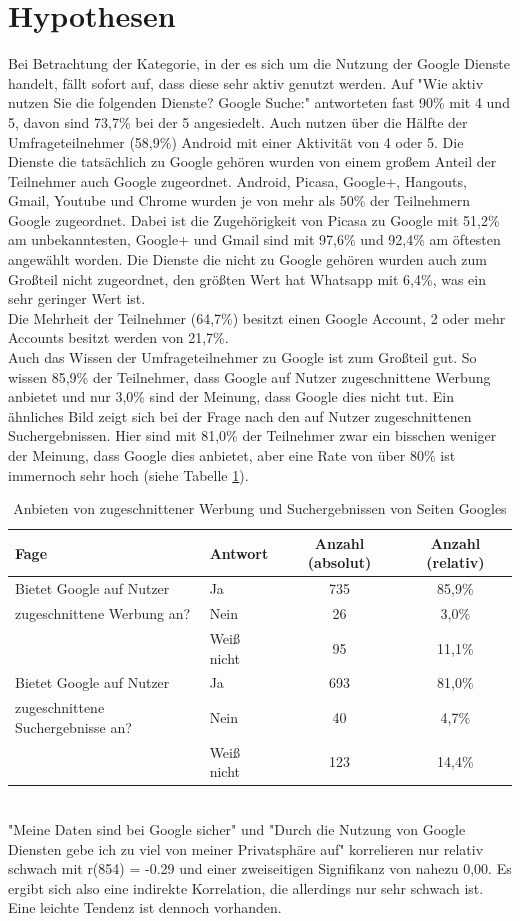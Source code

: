 \section{Hypothesen}
Bei Betrachtung der Kategorie, in der es sich um die Nutzung der Google Dienste handelt, fällt sofort auf, dass diese sehr aktiv genutzt werden. Auf "Wie aktiv nutzen Sie die folgenden Dienste? Google Suche:" antworteten fast 90\% mit 4 und 5, davon sind 73,7\% bei der 5 angesiedelt. Auch nutzen über die Hälfte der Umfrageteilnehmer (58,9\%) Android mit einer Aktivität von 4 oder 5.
Die Dienste die tatsächlich zu Google gehören wurden von einem großem Anteil der Teilnehmer auch Google zugeordnet. Android, Picasa, Google+, Hangouts, Gmail, Youtube und Chrome wurden je von mehr als 50\% der Teilnehmern Google zugeordnet. Dabei ist die Zugehörigkeit von Picasa zu Google mit 51,2\% am unbekanntesten, Google+ und Gmail sind mit 97,6\% und 92,4\% am öftesten angewählt worden. Die Dienste die nicht zu Google gehören wurden auch zum Großteil nicht zugeordnet, den größten Wert hat Whatsapp mit 6,4\%, was ein sehr geringer Wert ist.\\
Die Mehrheit der Teilnehmer (64,7\%) besitzt einen Google Account, 2 oder mehr Accounts besitzt werden von 21,7\%.\\
Auch das Wissen der Umfrageteilnehmer zu Google ist zum Großteil gut. So wissen 85,9\% der Teilnehmer, dass Google auf Nutzer zugeschnittene Werbung anbietet und nur 3,0\% sind der Meinung, dass Google dies nicht tut. Ein ähnliches Bild zeigt sich bei der Frage nach den auf Nutzer zugeschnittenen Suchergebnissen. Hier sind mit 81,0\% der Teilnehmer zwar ein bisschen weniger der Meinung, dass Google dies anbietet, aber eine Rate von über 80\% ist immernoch sehr hoch (siehe Tabelle \ref{fittingAdsAndSearch}).\\
\begin{table}
	\begin{tabular}[]{l| l | c | c}
		\hline
		Fage & Antwort & Anzahl (absolut) & Anzahl (relativ)\\ \hline \hline
		Bietet Google auf Nutzer& Ja & 735 & 85,9\%\\
		zugeschnittene Werbung an? & Nein & 26 & 3,0\%\\
		& Weiß nicht & 95 & 11,1\% \\
		\hline
		Bietet Google auf Nutzer& Ja & 693 & 81,0\% \\
		zugeschnittene Suchergebnisse an? & Nein & 40 & 4,7\% \\
		& Weiß nicht & 123 & 14,4\% \\
		 \hline
	\end{tabular}
	\caption{Anbieten von zugeschnittener Werbung und Suchergebnissen von Seiten Googles}\label{fittingAdsAndSearch}
\end{table}
\\"Meine Daten sind bei Google sicher" und "Durch die Nutzung von Google Diensten gebe ich zu viel von meiner Privatsphäre auf" korrelieren nur relativ schwach mit r(854) = -0.29 und einer zweiseitigen Signifikanz von nahezu 0,00. Es ergibt sich also eine indirekte Korrelation, die allerdings nur sehr schwach ist. Eine leichte Tendenz ist dennoch vorhanden.

